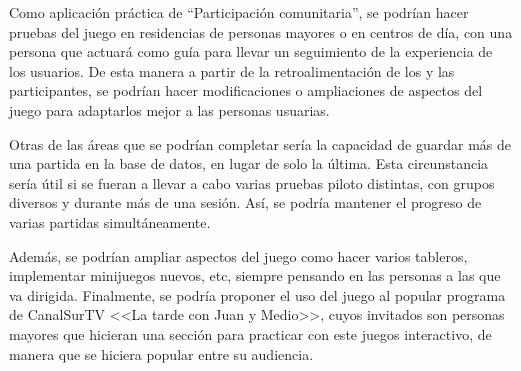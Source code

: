Como aplicación práctica de \enquote{Participación comunitaria}, se podrían hacer pruebas del juego en residencias de personas mayores o en centros de día, con una persona que actuará como guía para llevar un seguimiento de la experiencia de los usuarios. De esta manera a partir de la retroalimentación de los y las participantes, se podrían hacer modificaciones o ampliaciones de aspectos del juego para adaptarlos mejor a las personas usuarias.

Otras de las áreas que se podrían completar sería la capacidad de guardar más de una partida en la base de datos, en lugar de solo la última. Esta circunstancia sería útil si se fueran a llevar a cabo varias pruebas piloto distintas, con grupos diversos y durante más de una sesión. Así, se podría mantener el progreso de varias partidas simultáneamente.

Además, se podrían ampliar aspectos del juego como hacer varios tableros, implementar minijuegos nuevos, etc, siempre pensando en las personas a las que va dirigida. Finalmente, se podría proponer el uso del juego al popular programa de CanalSurTV <<La tarde con Juan y Medio>>, cuyos invitados son personas mayores que hicieran una sección para practicar con este juegos interactivo, de manera que se hiciera popular entre su audiencia.
